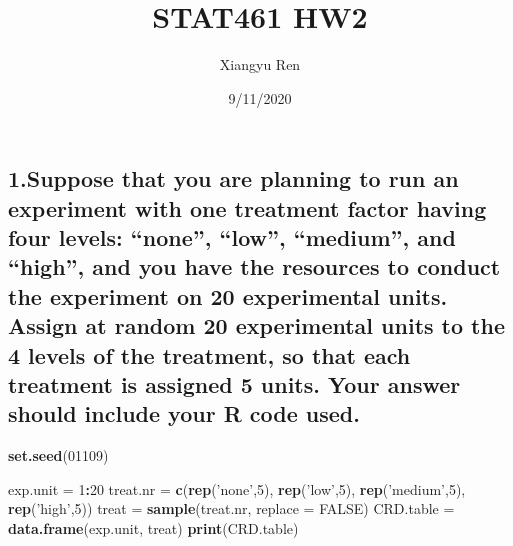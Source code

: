 \documentclass[
]{article}
\title{STAT461 HW2}
\author{Xiangyu Ren}
\date{9/11/2020}
\newenvironment{Shaded}{\begin{snugshade}}{\end{snugshade}}
\newcommand{\DataTypeTok}[1]{\textcolor[rgb]{0.13,0.29,0.53}{#1}}
\newcommand{\DecValTok}[1]{\textcolor[rgb]{0.00,0.00,0.81}{#1}}
\newcommand{\KeywordTok}[1]{\textcolor[rgb]{0.13,0.29,0.53}{\textbf{#1}}}
\newcommand{\NormalTok}[1]{#1}
\newcommand{\OperatorTok}[1]{\textcolor[rgb]{0.81,0.36,0.00}{\textbf{#1}}}
\newcommand{\OtherTok}[1]{\textcolor[rgb]{0.56,0.35,0.01}{#1}}
\newcommand{\StringTok}[1]{\textcolor[rgb]{0.31,0.60,0.02}{#1}}
\begin{document}
\maketitle

\hypertarget{suppose-that-you-are-planning-to-run-an-experiment-with-one-treatment-factor-having-four-levels-none-low-medium-and-high-and-you-have-the-resources-to-conduct-the-experiment-on-20-experimental-units.-assign-at-random-20-experimental-units-to-the-4-levels-of-the-treatment-so-that-each-treatment-is-assigned-5-units.-your-answer-should-include-your-r-code-used.}{%
\subsection{1.Suppose that you are planning to run an experiment with
one treatment factor having four levels: ``none'', ``low'', ``medium'',
and ``high'', and you have the resources to conduct the experiment on 20
experimental units. Assign at random 20 experimental units to the 4
levels of the treatment, so that each treatment is assigned 5 units.
Your answer should include your R code
used.}\label{suppose-that-you-are-planning-to-run-an-experiment-with-one-treatment-factor-having-four-levels-none-low-medium-and-high-and-you-have-the-resources-to-conduct-the-experiment-on-20-experimental-units.-assign-at-random-20-experimental-units-to-the-4-levels-of-the-treatment-so-that-each-treatment-is-assigned-5-units.-your-answer-should-include-your-r-code-used.}}

\begin{Shaded}
\begin{Highlighting}[]
\KeywordTok{set.seed}\NormalTok{(}\DecValTok{01109}\NormalTok{)}

\NormalTok{exp.unit =}\StringTok{ }\DecValTok{1}\OperatorTok{:}\DecValTok{20}
\NormalTok{treat.nr =}\StringTok{ }\KeywordTok{c}\NormalTok{(}\KeywordTok{rep}\NormalTok{(}\StringTok{'none'}\NormalTok{,}\DecValTok{5}\NormalTok{), }\KeywordTok{rep}\NormalTok{(}\StringTok{'low'}\NormalTok{,}\DecValTok{5}\NormalTok{), }\KeywordTok{rep}\NormalTok{(}\StringTok{'medium'}\NormalTok{,}\DecValTok{5}\NormalTok{), }\KeywordTok{rep}\NormalTok{(}\StringTok{'high'}\NormalTok{,}\DecValTok{5}\NormalTok{))}
\NormalTok{treat =}\StringTok{ }\KeywordTok{sample}\NormalTok{(treat.nr, }\DataTypeTok{replace =} \OtherTok{FALSE}\NormalTok{)}
\NormalTok{CRD.table =}\StringTok{ }\KeywordTok{data.frame}\NormalTok{(exp.unit, treat)}
\KeywordTok{print}\NormalTok{(CRD.table)}
\end{Highlighting}
\end{Shaded}
\end{document}
